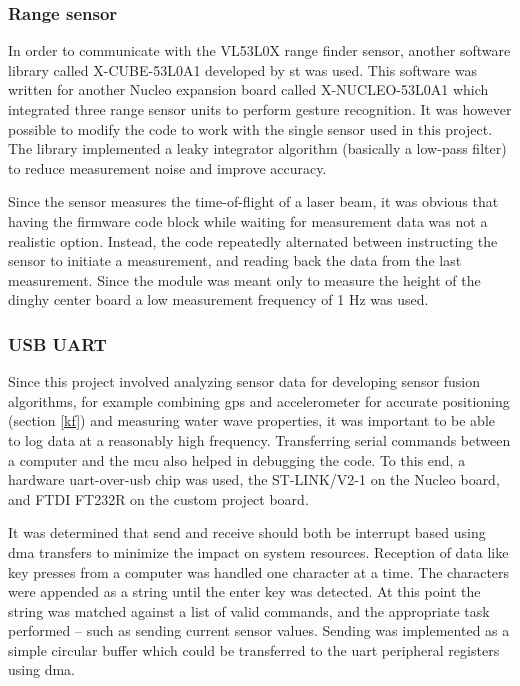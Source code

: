 \subsubsection{Range sensor}
In order to communicate with the VL53L0X range finder sensor, another software library called X-CUBE-53L0A1 \cite{x-cube-53l0a} developed by \gls{st} was used. This software was written for another Nucleo expansion board called X-NUCLEO-53L0A1 which integrated three range sensor units to perform gesture recognition. It was however possible to modify the code to work with the single sensor used in this project. The library implemented a leaky integrator algorithm (basically a low-pass filter) to reduce measurement noise and improve accuracy.

Since the sensor measures the time-of-flight of a laser beam, it was obvious that having the firmware code block while waiting for measurement data was not a realistic option. Instead, the code repeatedly alternated between instructing the sensor to initiate a measurement, and reading back the data from the last measurement. Since the module was meant only to measure the height of the dinghy center board a low measurement frequency of 1 Hz was used.


\subsubsection{USB UART}
\label{usb-uart}
Since this project involved analyzing sensor data for developing sensor fusion algorithms, for example combining \gls{gps} and accelerometer for accurate positioning (section \ref{kf}) and measuring water wave properties, it was important to be able to log data at a reasonably high frequency. Transferring serial commands between a computer and the \gls{mcu} also helped in debugging the code. To this end, a hardware \gls{uart}-over-\gls{usb} chip was used, the ST-LINK/V2-1 on the Nucleo board, and FTDI FT232R on the custom project board.

It was determined that send and receive should both be interrupt based using \gls{dma} transfers to minimize the impact on system resources. Reception of data like key presses from a computer was handled one character at a time. The characters were appended as a string until the enter key was detected. At this point the string was matched against a list of valid commands, and the appropriate task performed -- such as sending current sensor values. Sending was implemented as a simple circular buffer which could be transferred to the \gls{uart} peripheral registers using \gls{dma}.

